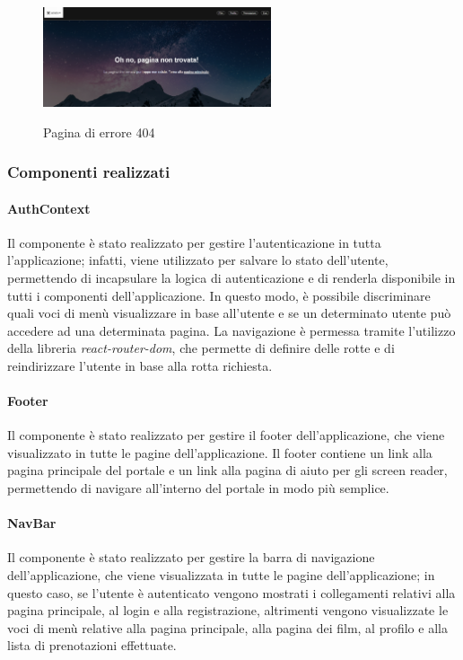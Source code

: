\begin{figure}[h]
    \centering
    \includegraphics[width=0.6\textwidth, alt={Schermata della pagina di errore 404}]{immagini/frontend/404.png}
    \caption{Pagina di errore 404}\label{fig:errore-404}
\end{figure}

\subsubsection{Componenti realizzati}

\paragraph{AuthContext}
Il componente è stato realizzato per gestire l'autenticazione in tutta l'applicazione; infatti, viene utilizzato per salvare lo stato dell'utente,
permettendo di incapsulare la logica di autenticazione e di renderla disponibile in tutti i componenti dell'applicazione.
In questo modo, è possibile discriminare quali voci di menù visualizzare in base all'utente e se un determinato utente può accedere ad una determinata pagina.
La navigazione è permessa tramite l'utilizzo della libreria \textit{react-router-dom}, che permette di definire delle rotte e di reindirizzare l'utente in base alla rotta richiesta.

\paragraph{Footer}
Il componente è stato realizzato per gestire il footer dell'applicazione, che viene visualizzato in tutte le pagine dell'applicazione.
Il footer contiene un link alla pagina principale del portale e un link alla pagina di aiuto per gli screen reader, permettendo di navigare all'interno del portale in modo più semplice.

\paragraph{NavBar}
Il componente è stato realizzato per gestire la barra di navigazione dell'applicazione, che viene visualizzata in tutte le pagine dell'applicazione; in questo caso, se l'utente è autenticato vengono
mostrati i collegamenti relativi alla pagina principale, al login e alla registrazione, altrimenti vengono visualizzate le voci di menù relative alla pagina principale, alla pagina dei film, al profilo e alla lista di prenotazioni effettuate.

